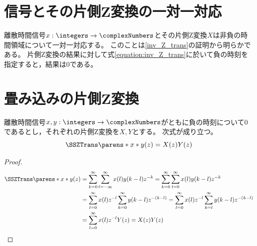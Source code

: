         \section{信号とその片側Z変換の一対一対応}
            離散時間信号$x:\integers\to\complexNumbers$とその片側Z変換$X$は非負の時間領域について一対一対応する。
            このことは\ref{inv_Z_trans}の証明から明らかである。
            片側Z変換の結果に対して式\eqref{equation:inv_Z_trans}に於いて負の時刻を指定すると，結果は0である。
        \section{畳み込みの片側Z変換}
            \label{single_sided_Z_transform_of_convolution}
            \begin{shadebox}
                離散時間信号$x,y:\integers\to\complexNumbers$がともに負の時刻について0であるとし，それぞれの片側Z変換を$X,Y$とする。
                次式が成り立つ。
                \[ \SSZTrans\parens*{x*y}(z) = X(z)Y(z) \]
            \end{shadebox}
            \begin{proof}
                \begin{align*}
                    \SSZTrans\parens*{x*y}(z) &= \sum_{k=0}^\infty \sum_{l=-\infty}^\infty x(l)y(k-l) z^{-k} = \sum_{k=0}^\infty \sum_{l=0}^\infty x(l)y(k-l) z^{-k} \\
                    &= \sum_{l=0}^\infty x(l)z^{-l} \sum_{k=0}^\infty y(k-l) z^{-(k-l)} = \sum_{l=0}^\infty x(l)z^{-l} \sum_{k=l}^\infty y(k-l) z^{-(k-l)} \\
                    &= \sum_{l=0}^\infty x(l)z^{-l} Y(z) = X(z)Y(z)
                \end{align*}
            \end{proof}
